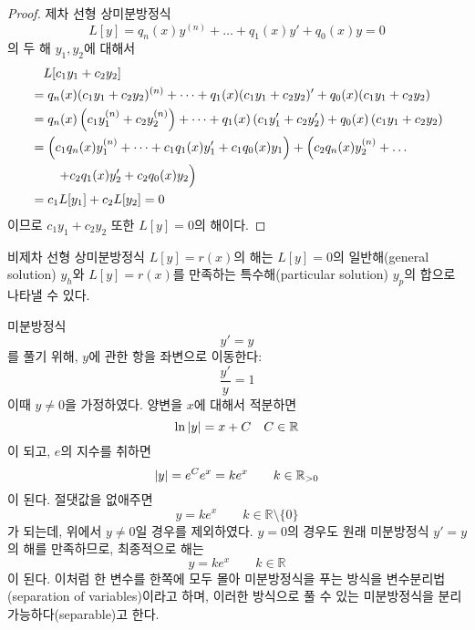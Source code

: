 \documentclass[../engineering_mathematics_lecture_note.tex]{subfiles}
\begin{document}
\begin{proof}
    제차 선형 상미분방정식
    \begin{equation*}
        L[y] = q_n(x) y^{(n)} + \dots + q_1(x) y' + q_0(x) y = 0
    \end{equation*}
    의 두 해 $y_1, y_2$에 대해서
    \begin{align*}
        &\quad L[c_1 y_1 + c_2 y_2]\\
        &= q_n(x) (c_1 y_1 + c_2 y_2)^{(n)} + \dots + q_1(x) (c_1 y_1 + c_2 y_2)' + q_0(x) (c_1 y_1 + c_2 y_2)\\
        &= q_n(x) \left(c_1 y_1^{(n)} + c_2 y_2^{(n)}\right) + \dots + q_1(x) \left(c_1 y_1' + c_2 y_2'\right) + q_0(x) \left(c_1 y_1 + c_2 y_2\right)\\
        &= \left(c_1 q_n(x) y_1^{(n)} + \dots + c_1 q_1(x) y_1' + c_1 q_0(x) y_1\right) + \left(c_2 q_n(x) y_2^{(n)} + \dots\right.\\
        &\qquad\left.+ c_2 q_1(x) y_2' + c_2 q_0(x) y_2\vphantom{y^{(n)}}\right)\\
                             &= c_1 L[y_1] + c_2 L[y_2] = 0
    \end{align*}
    이므로 $c_1 y_1 + c_2 y_2$ 또한 $L[y] = 0$의 해이다.
\end{proof}

\begin{theorem} \label{thm:general_particular}
    비제차 선형 상미분방정식 $L[y] = r(x)$의 해는 $L[y] = 0$의 일반해(general solution) $y_h$와 $L[y] = r(x)$를 만족하는 특수해(particular solution) $y_p$의 합으로 나타낼 수 있다.
\end{theorem}

\begin{example}
    미분방정식
    \begin{equation*}
        y' = y
    \end{equation*}
    를 풀기 위해, $y$에 관한 항을 좌변으로 이동한다:
    \begin{equation*}
        \frac{y'}{y} = 1
    \end{equation*}
    이때 $y \neq 0$을 가정하였다.
    양변을 $x$에 대해서 적분하면
    \begin{equation*}
        \ln \abs{y} = x + C \quad C \in \mathbb R
    \end{equation*}
    이 되고, $e$의 지수를 취하면
    \begin{equation*}
        \abs{y} = e^C e^x = k e^x \qquad k \in \mathbb R_{> 0}
    \end{equation*}
    이 된다.
    절댓값을 없애주면
    \begin{equation*}
        y = k e^x \qquad k \in \mathbb R \setminus \{0\}
    \end{equation*}
    가 되는데, 위에서 $y \neq 0$일 경우를 제외하였다.
    $y = 0$의 경우도 원래 미분방정식 $y' = y$의 해를 만족하므로, 최종적으로 해는
    \begin{equation*}
        y = k e^x \qquad k \in \mathbb R
    \end{equation*}
    이 된다.
    이처럼 한 변수를 한쪽에 모두 몰아 미분방정식을 푸는 방식을 변수분리법(separation of variables)이라고 하며, 이러한 방식으로 풀 수 있는 미분방정식을 분리 가능하다(separable)고 한다.
\end{example}
\end{document}
